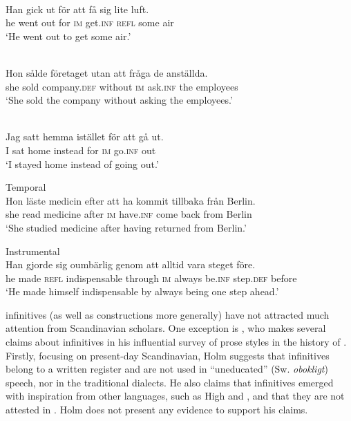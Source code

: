 \documentclass[output=paper]{langscibook}
\begin{document}
\ea
\label{ex:kalm:1}
\ea {}\label{ex:kalm:1a}\\
\gll Han gick ut för att få sig lite luft.\\
he went out for \textsc{im} get.\textsc{inf} \textsc{refl} some air\\
\glt ‘He went out to get some air.’

\ex {}\label{ex:kalm:1b}\\
\gll Hon sålde företaget utan att fråga de anställda.\\
she sold company.\textsc{def} without \textsc{im} ask.\textsc{inf} the employees\\
\glt ‘She sold the company without asking the employees.’

\ex {}\label{ex:kalm:1c}\\
\gll Jag satt hemma istället för att gå ut.\\
I sat home instead for \textsc{im} go.\textsc{inf} out\\
\glt‘I stayed home instead of going out.’

\ex Temporal\label{ex:kalm:1d}\\
\gll Hon läste medicin efter att ha kommit tillbaka från Berlin.\\
she read medicine after \textsc{im} have.\textsc{inf} come back from Berlin\\
\glt ‘She studied medicine after having returned from Berlin.’

\ex Instrumental\label{ex:kalm:1e}\\
\gll Han gjorde sig oumbärlig genom att alltid vara steget före.\\
he made \textsc{refl} indispensable through \textsc{im} always be.\textsc{inf} step.\textsc{def} before\\
\glt ‘He made himself indispensable by always being one step ahead.’
\z
\z

 infinitives (as well as  constructions more generally) have not attracted much attention from Scandinavian scholars. One exception is \citet{Holm1967}, who makes several claims about  infinitives in his influential survey of prose styles in the history of . Firstly, focusing on present-day Scandinavian, Holm suggests that  infinitives belong to a written register and are not used in “uneducated” (Sw. \textit{obokligt}) speech, nor in the traditional dialects. He also claims that  infinitives emerged with inspiration from other languages, such as High  and , and that they are not attested in  \citep[27]{Holm1967}. Holm does not present any evidence to support his claims. 
\end{document}
